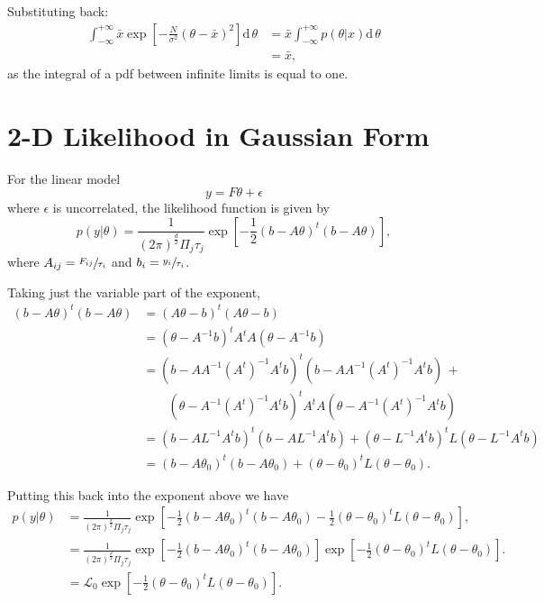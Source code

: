 \documentclass[a4paper,11pt,twoside]{article}
\begin{document}
Substituting back:
\begin{align*}
	\int_{-\infty}^{+\infty} \bar{x} \exp \left[- \frac{N}{\sigma^2} (\theta - \bar{x})^2 \right] \mathrm{d} \, \theta &= \bar{x} \int_{-\infty}^{+\infty} p(\theta|x) \mathrm{d} \, \theta
	\\ &= \bar{x},
\end{align*}
as the integral of a pdf between infinite limits is equal to one. 

\section{2-D Likelihood in Gaussian Form}
\label{sec:2dlikelihood}

For the linear model
\begin{equation*}
	y = F\theta + \epsilon
\end{equation*}
where $\epsilon$ is uncorrelated, the likelihood function is given by
\begin{equation*}
	p(y|\theta) = \frac{1}{(2\pi)^{\frac{d}{2}}\Pi_j\tau_j} \exp\left[-\frac{1}{2}(b - A\theta)^t(b-A\theta)\right],
\end{equation*}
where $A_{ij} = \sfrac{F_{ij}}{\tau_i}$ and $b_i = \sfrac{y_i}{\tau_i}$.

Taking just the variable part of the exponent,
\begin{align*}
	(b - A\theta)^t(b-A\theta) &= (A\theta - b)^t(A\theta - b)
	\\ &= (\theta - A^{-1}b)^tA^tA(\theta - A^{-1}b)
	\\ &= (b - AA^{-1}(A^t)^{-1}A^tb)^t(b - AA^{-1}(A^t)^{-1}A^tb) \, + \\ & \qquad (\theta - A^{-1} (A^t)^{-1} A^t b)^t A^t A(\theta - A^{-1} (A^t)^{-1} A^t b)
	\\ &= (b - A L^{-1} A^t b)^t (b - A L^{-1} A^t b) + (\theta - L^{-1} A^t b)^t L (\theta - L^{-1} A^t b)
	\\ &= (b - A \theta_0)^t (b - A \theta_0) + (\theta - \theta_0)^t L (\theta - \theta_0).
\end{align*}

Putting this back into the exponent above we have
\begin{align*}
	p(y|\theta) &= \frac{1}{(2\pi)^{\frac{d}{2}}\Pi_j\tau_j} \exp\left[-\frac{1}{2}(b - A \theta_0)^t (b - A \theta_0) -\frac{1}{2}(\theta - \theta_0)^t L (\theta - \theta_0)\right],
	\\ &= \frac{1}{(2\pi)^{\frac{d}{2}}\Pi_j\tau_j} \exp\left[-\frac{1}{2}(b - A \theta_0)^t (b - A \theta_0)\right] \exp\left[-\frac{1}{2} (\theta - \theta_0)^t L (\theta - \theta_0)\right].
	\\ &= \mathcal{L}_0 \exp\left[-\frac{1}{2} (\theta - \theta_0)^t L (\theta - \theta_0)\right].
\end{align*}
\end{document}
